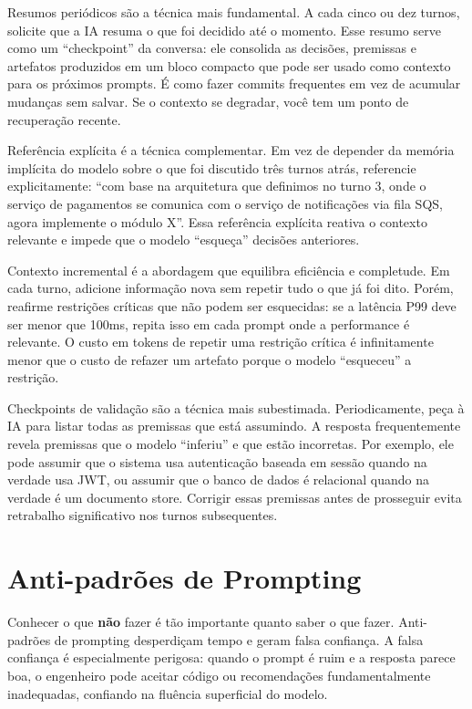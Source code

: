 Resumos periódicos são a técnica mais fundamental. A cada cinco ou dez turnos,
solicite que a IA resuma o que foi decidido até o momento. Esse resumo serve como
um ``checkpoint'' da conversa: ele consolida as decisões, premissas e artefatos
produzidos em um bloco compacto que pode ser usado como contexto para os próximos
prompts. É como fazer commits frequentes em vez de acumular mudanças sem salvar.
Se o contexto se degradar, você tem um ponto de recuperação recente.

Referência explícita é a técnica complementar. Em vez de depender da memória
implícita do modelo sobre o que foi discutido três turnos atrás, referencie
explicitamente: ``com base na arquitetura que definimos no turno 3, onde o serviço
de pagamentos se comunica com o serviço de notificações via fila SQS, agora
implemente o módulo X''. Essa referência explícita reativa o contexto relevante
e impede que o modelo ``esqueça'' decisões anteriores.

Contexto incremental é a abordagem que equilibra eficiência e completude. Em cada
turno, adicione informação nova sem repetir tudo o que já foi dito. Porém,
reafirme restrições críticas que não podem ser esquecidas: se a latência P99 deve
ser menor que 100ms, repita isso em cada prompt onde a performance é relevante.
O custo em tokens de repetir uma restrição crítica é infinitamente menor que o
custo de refazer um artefato porque o modelo ``esqueceu'' a restrição.

Checkpoints de validação são a técnica mais subestimada. Periodicamente, peça à
IA para listar todas as premissas que está assumindo. A resposta frequentemente
revela premissas que o modelo ``inferiu'' e que estão incorretas. Por exemplo,
ele pode assumir que o sistema usa autenticação baseada em sessão quando na verdade usa JWT,
ou assumir que o banco de dados é relacional quando na verdade é um
documento store. Corrigir essas premissas antes de prosseguir evita retrabalho
significativo nos turnos subsequentes.

\section{Anti-padrões de Prompting}

Conhecer o que \textbf{não} fazer é tão importante quanto saber o que fazer.
Anti-padrões de prompting desperdiçam tempo e geram falsa confiança. A falsa
confiança é especialmente perigosa: quando o prompt é ruim e a resposta parece
boa, o engenheiro pode aceitar código ou recomendações fundamentalmente
inadequadas, confiando na fluência superficial do modelo.

